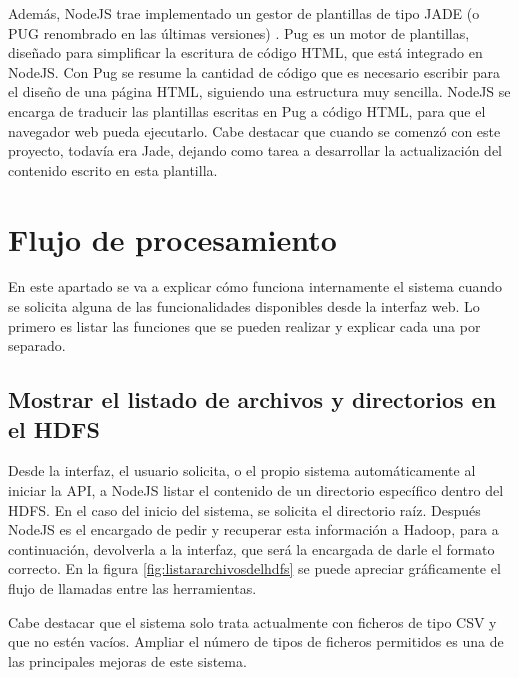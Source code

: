 Además, NodeJS trae implementado un gestor de plantillas de tipo JADE (o PUG renombrado en las últimas versiones) \cite{PugInicial}. Pug es un motor de plantillas, diseñado para simplificar la escritura de código HTML, que está integrado en NodeJS. Con Pug se resume la cantidad de código que es necesario escribir para el diseño de una página HTML, siguiendo una estructura muy sencilla. NodeJS se encarga de traducir las plantillas escritas en Pug a código HTML, para que el navegador web pueda ejecutarlo. Cabe destacar que cuando se comenzó con este proyecto, todavía era Jade, dejando como tarea a desarrollar la actualización del contenido escrito en esta plantilla.

\section{Flujo de procesamiento}

En este apartado se va a explicar cómo funciona internamente el sistema cuando se solicita alguna de las funcionalidades disponibles desde la interfaz web. Lo primero es listar las funciones que se pueden realizar y explicar cada una por separado. 

\subsection{Mostrar el listado de archivos y directorios en el HDFS}

Desde la interfaz, el usuario solicita, o el propio sistema automáticamente al iniciar la API, a NodeJS listar el contenido de un directorio específico dentro del HDFS. En el caso del inicio del sistema, se solicita el directorio raíz. Después NodeJS es el encargado de pedir y recuperar esta información a Hadoop, para a continuación, devolverla a la interfaz, que será la encargada de darle el formato correcto. En la figura \ref{fig:listararchivosdelhdfs} se puede apreciar gráficamente el flujo de llamadas entre las herramientas.

Cabe destacar que el sistema solo trata actualmente con ficheros de tipo CSV y que no estén vacíos. Ampliar el número de tipos de ficheros permitidos es una de las principales mejoras de este sistema.

